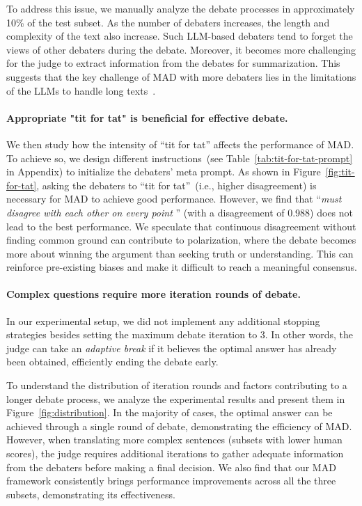 To address this issue, we manually analyze the debate processes in approximately 10\% of the test subset. As the number of debaters increases, the length and complexity of the text also increase. Such LLM-based debaters tend to forget the views of other debaters during the debate. Moreover, it becomes more challenging for the judge to extract information from the debates for summarization. This suggests that the key challenge of MAD with more debaters lies in the limitations of the LLMs to handle long texts~\citep{liu2023lost}.



\paragraph{Appropriate "tit for tat" is beneficial for effective debate.}
We then study how the intensity of ``tit for tat'' affects the performance of MAD.
To achieve so, we design different instructions~(see Table~\ref{tab:tit-for-tat-prompt} in Appendix) to initialize the debaters' meta prompt. As shown in Figure~\ref{fig:tit-for-tat}, asking the debaters to ``tit for tat''~(i.e., higher disagreement) is necessary for MAD to achieve good performance. However, we find that ``\textit{must disagree with each other on every point }'' (with a disagreement of 0.988) does not lead to the best performance.
We speculate that continuous disagreement without finding common ground can contribute to polarization, where the debate becomes more about winning the argument than seeking truth or understanding. This can reinforce pre-existing biases and make it difficult to reach a meaningful consensus.


\paragraph{Complex questions require more iteration rounds of debate.}
In our experimental setup, we did not implement any additional stopping strategies besides setting the maximum debate iteration to 3. In other words, the judge can take an \textit{adaptive break} if it believes the optimal answer has already been obtained, efficiently ending the debate early.

To understand the distribution of iteration rounds and factors contributing to a longer debate process, we analyze the experimental results and present them in Figure~\ref{fig:distribution}. In the majority of cases, the optimal answer can be achieved through a single round of debate, demonstrating the efficiency of MAD. However, when translating more complex sentences (subsets with lower human scores), the judge requires additional iterations to gather adequate information from the debaters before making a final decision.
We also find that our MAD framework consistently brings performance improvements across all the three subsets, demonstrating its effectiveness.

